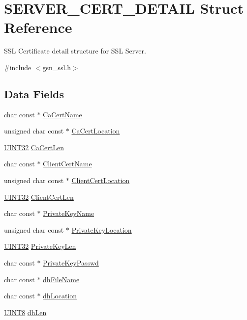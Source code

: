\hypertarget{a00459}{
\section{SERVER\_\-CERT\_\-DETAIL Struct Reference}
\label{a00459}
}


SSL Certificate detail structure for SSL Server.  




{\ttfamily \#include $<$gsn\_\-ssl.h$>$}

\subsection*{Data Fields}
\begin{DoxyCompactItemize}
\item 
char const $\ast$ \hyperlink{a00459_a35fa49b31ae551ffed3a976202888be0}{CaCertName}
\item 
unsigned char const $\ast$ \hyperlink{a00459_a6b471671a19ca86a86b8a4d03eb1d734}{CaCertLocation}
\item 
\hyperlink{a00660_gae1e6edbbc26d6fbc71a90190d0266018}{UINT32} \hyperlink{a00459_a05a7cb062be3de800ccb2229d9390c89}{CaCertLen}
\item 
char const $\ast$ \hyperlink{a00459_a2a5946e7695789360a828cfff2153714}{ClientCertName}
\item 
unsigned char const $\ast$ \hyperlink{a00459_a3363280bf236e6181c6a7ffba2c87d1c}{ClientCertLocation}
\item 
\hyperlink{a00660_gae1e6edbbc26d6fbc71a90190d0266018}{UINT32} \hyperlink{a00459_a4938ca533f0444591a80f068314d1575}{ClientCertLen}
\item 
char const $\ast$ \hyperlink{a00459_a7d771bf113c49f357a3eed2709cf112b}{PrivateKeyName}
\item 
unsigned char const $\ast$ \hyperlink{a00459_a0d8315d61583cc39883e6925c388440a}{PrivateKeyLocation}
\item 
\hyperlink{a00660_gae1e6edbbc26d6fbc71a90190d0266018}{UINT32} \hyperlink{a00459_a998d59b4ae426bc3c1bd394484494a85}{PrivateKeyLen}
\item 
char const $\ast$ \hyperlink{a00459_a733cc877fa0c06d5642460e0d2ad91f1}{PrivateKeyPasswd}
\item 
char const $\ast$ \hyperlink{a00459_aaff19020db7bd0e1d0bee3b7ee1a9271}{dhFileName}
\item 
char const $\ast$ \hyperlink{a00459_ae4ab0d69e1b5ac49d6468ba5d780c8c2}{dhLocation}
\item 
\hyperlink{a00660_gab27e9918b538ce9d8ca692479b375b6a}{UINT8} \hyperlink{a00459_a69fcfbf80e52b3a6a68deed32fd4e026}{dhLen}
\end{DoxyCompactItemize}


